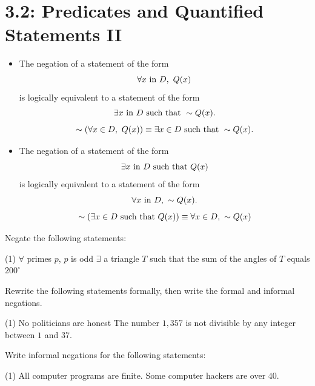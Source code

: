 \documentclass[../mathNotesPreamble]{subfiles}
\providecommand{\relscalefact}{1.4}
\begin{document}
\relscale{\relscalefact}
  \section{3.2: Predicates and Quantified Statements II}

  \begin{defn*}
    \begin{itemize}
      \item
        The negation of a statement of the form
          \[\forall x \textnormal{ in } D,\ Q(x)\]
        is logically equivalent to a statement of the form
          \[\exists x\textnormal{ in } D \textnormal{ such that } \sim Q(x).\]
          \[\sim\parens{\forall x\in D,\ Q(x)} \equiv \exists x\in D\st \sim Q(x).\]
      \item
        The negation of a statement of the form
          \[\exists x\textnormal{ in } D \textnormal{ such that } Q(x)\]
        is logically equivalent to a statement of the form
          \[\forall x\textnormal{ in } D,\ \sim Q(x).\]
          \[\sim{\left(\exists x\in D\textnormal{ such that }Q(x)\right)}\equiv \forall x\in D,\ \sim Q(x)\]
    \end{itemize}
  \end{defn*}

  \begin{ex*}
    Negate the following statements:
    \begin{extasks}[after-item-skip=\stretch{1}](1)
      \task $\forall$ primes $p$, $p$ is odd
      \task $\exists$ a triangle $T$ such that the sum of the angles of $T$ equals $200^\circ$
    \end{extasks}
  \end{ex*}
  \pagebreak

  \begin{ex*}
    Rewrite the following statements formally, then write the formal and informal negations.
    \begin{extasks}[after-item-skip=\stretch{1}](1)
      \task No politicians are honest
      \task The number $1,357$ is not divisible by any integer between $1$ and $37$.
    \end{extasks}
  \end{ex*}
  \begin{ex*}
    Write informal negations for the following statements:
    \begin{extasks}[after-item-skip=\stretch{1}](1)
      \task All computer programs are finite.
      \task Some computer hackers are over $40$.
    \end{extasks}
  \end{ex*}
  \pagebreak
\end{document}
